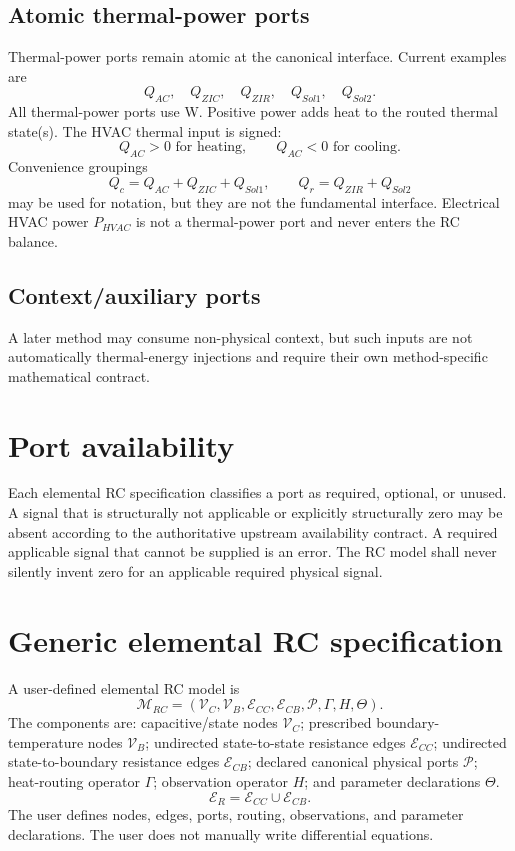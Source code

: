 \documentclass[11pt]{article}
\newcommand{\Vc}{\mathcal{V}_{C}}
\newcommand{\Vb}{\mathcal{V}_{B}}
\newcommand{\Ecc}{\mathcal{E}_{CC}}
\newcommand{\Ecb}{\mathcal{E}_{CB}}
\newcommand{\Er}{\mathcal{E}_{R}}
\newcommand{\Pset}{\mathcal{P}}
\begin{document}
\subsection{Atomic thermal-power ports}
Thermal-power ports remain atomic at the canonical interface. Current examples are
\[
Q_{AC},\quad Q_{ZIC},\quad Q_{ZIR},\quad Q_{Sol1},\quad Q_{Sol2}.
\]
All thermal-power ports use W. Positive power adds heat to the routed thermal state(s). The HVAC thermal input is signed:
\[
Q_{AC}>0 \text{ for heating},\qquad Q_{AC}<0 \text{ for cooling}.
\]
Convenience groupings
\[
Q_c=Q_{AC}+Q_{ZIC}+Q_{Sol1},\qquad Q_r=Q_{ZIR}+Q_{Sol2}
\]
may be used for notation, but they are not the fundamental interface. Electrical HVAC power $P_{HVAC}$ is not a thermal-power port and never enters the RC balance.

\subsection{Context/auxiliary ports}
A later method may consume non-physical context, but such inputs are not automatically thermal-energy injections and require their own method-specific mathematical contract.

\section{Port availability}
Each elemental RC specification classifies a port as required, optional, or unused. A signal that is structurally not applicable or explicitly structurally zero may be absent according to the authoritative upstream availability contract. A required applicable signal that cannot be supplied is an error. The RC model shall never silently invent zero for an applicable required physical signal.

\section{Generic elemental RC specification}
A user-defined elemental RC model is
\[
\boxed{\mathcal{M}_{RC}=(\Vc,\Vb,\Ecc,\Ecb,\Pset,\Gamma,H,\Theta).}
\]
The components are: capacitive/state nodes $\Vc$; prescribed boundary-temperature nodes $\Vb$; undirected state-to-state resistance edges $\Ecc$; undirected state-to-boundary resistance edges $\Ecb$; declared canonical physical ports $\Pset$; heat-routing operator $\Gamma$; observation operator $H$; and parameter declarations $\Theta$.
\[
\boxed{\Er=\Ecc\cup\Ecb.}
\]
The user defines nodes, edges, ports, routing, observations, and parameter declarations. The user does not manually write differential equations.
\end{document}
